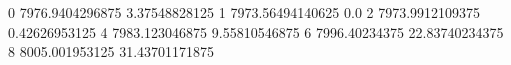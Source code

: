 0 7976.9404296875 3.37548828125
1 7973.56494140625 0.0
2 7973.9912109375 0.42626953125
4 7983.123046875 9.55810546875
6 7996.40234375 22.83740234375
8 8005.001953125 31.43701171875
